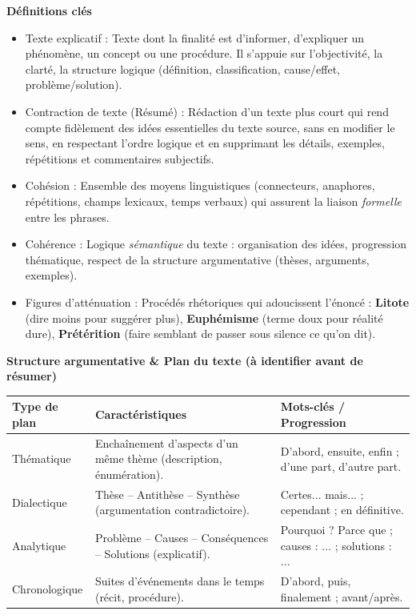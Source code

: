 \documentclass[11pt]{article}
\newcommand{\cle}[1]{{\popxbold\color{popdark}#1}}
\newcounter{popsec}
\newcounter{popsub}
\newcommand{\courssub}[1]{%
  \stepcounter{popsub}%
  \par\vspace{9pt}\noindent{\popxbold\fontsize{11.5}{13}\selectfont\color{popink}{\color{poporange}\thepopsec.\thepopsub}\hspace{6pt}#1}\par\nopagebreak\vspace{4pt}
}
\begin{document}
\courssub{Bilan synthétique}

\begin{aretenir}

\textbf{Définitions clés}
\begin{itemize}
  \item \cle{Texte explicatif} : Texte dont la finalité est d'informer, d'expliquer un phénomène, un concept ou une procédure. Il s'appuie sur l'objectivité, la clarté, la structure logique (définition, classification, cause/effet, problème/solution).
  \item \cle{Contraction de texte (Résumé)} : Rédaction d'un texte plus court qui rend compte fidèlement des idées essentielles du texte source, sans en modifier le sens, en respectant l'ordre logique et en supprimant les détails, exemples, répétitions et commentaires subjectifs.
  \item \cle{Cohésion} : Ensemble des moyens linguistiques (connecteurs, anaphores, répétitions, champs lexicaux, temps verbaux) qui assurent la liaison \emph{formelle} entre les phrases.
  \item \cle{Cohérence} : Logique \emph{sémantique} du texte : organisation des idées, progression thématique, respect de la structure argumentative (thèses, arguments, exemples).
  \item \cle{Figures d'atténuation} : Procédés rhétoriques qui adoucissent l'énoncé : \textbf{Litote} (dire moins pour suggérer plus), \textbf{Euphémisme} (terme doux pour réalité dure), \textbf{Prétérition} (faire semblant de passer sous silence ce qu'on dit).
\end{itemize}

\textbf{Structure argumentative \& Plan du texte (à identifier avant de résumer)}
\begin{center}
\begin{tabularx}{\linewidth}{|l|X|X|}\hline
\rowcolor{popblueL}
\textbf{Type de plan} & \textbf{Caractéristiques} & \textbf{Mots-clés / Progression} \\ \hline
\cle{Thématique} & Enchaînement d'aspects d'un même thème (description, énumération). & D'abord, ensuite, enfin ; d'une part, d'autre part. \\ \hline
\cle{Dialectique} & Thèse -- Antithèse -- Synthèse (argumentation contradictoire). & Certes... mais... ; cependant ; en définitive. \\ \hline
\cle{Analytique} & Problème -- Causes -- Conséquences -- Solutions (explicatif). & Pourquoi ? Parce que ; causes : ... ; solutions : ... \\ \hline
\cle{Chronologique} & Suites d'événements dans le temps (récit, procédure). & D'abord, puis, finalement ; avant/après. \\ \hline
\end{tabularx}
\end{center}


\end{aretenir}
\end{document}
